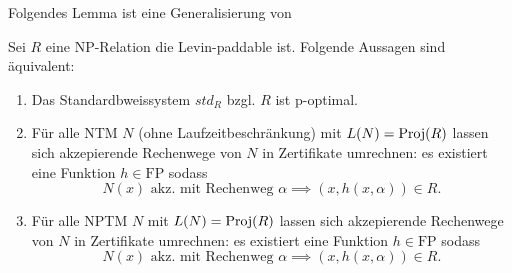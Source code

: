Folgendes Lemma ist eine Generalisierung von \textcite[Thm. 5.2]{messner_simulation_2001}
\begin{lemma}\label{lemma:stdps-q}
    Sei $R$ eine NP-Relation die Levin-paddable ist. Folgende Aussagen sind äquivalent:
    \begin{enumerate}
        \item Das Standardbweissystem $\mathit{std}_R$ bzgl. $R$ ist p-optimal.
        \item Für alle NTM $N$ (ohne Laufzeitbeschränkung) mit $L(N)=\operatorname{Proj}(R)$ lassen sich akzepierende Rechenwege von $N$ in Zertifikate umrechnen: es existiert eine Funktion $h\in\mathrm{FP}$ sodass
            \[ N(x) \text{ akz. mit Rechenweg $\alpha$} \implies (x,h(x,\alpha))\in R. \]
        \item Für alle NPTM $N$ mit $L(N)=\operatorname{Proj}(R)$ lassen sich akzepierende Rechenwege von $N$ in Zertifikate umrechnen: es existiert eine Funktion $h\in\mathrm{FP}$ sodass
            \[ N(x) \text{ akz. mit Rechenweg $\alpha$} \implies (x,h(x,\alpha))\in R. \]
    \end{enumerate}
\end{lemma}
